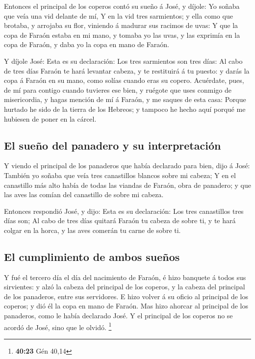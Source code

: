  Entonces el principal de los coperos contó su sueño á
José, y díjole: Yo soñaba que veía una vid delante de mí,
 Y en la vid tres sarmientos; y ella como que brotaba, y
arrojaba su flor, viniendo á madurar sus racimos de uvas:
 Y que la copa de Faraón estaba en mi mano, y tomaba yo
las uvas, y las exprimía en la copa de Faraón, y daba yo la copa en mano
de Faraón.

 Y díjole José: Esta es su declaración: Los tres
sarmientos son tres días:  Al cabo de tres días Faraón te
hará levantar cabeza, y te restituirá á tu puesto: y darás la copa á
Faraón en su mano, como solías cuando eras su copero. 
Acuérdate, pues, de mí para contigo cuando tuvieres ese bien, y ruégote
que uses conmigo de misericordia, y hagas mención de mí á Faraón, y me
saques de esta casa:  Porque hurtado he sido de la tierra
de los Hebreos; y tampoco he hecho aquí porqué me hubiesen de poner en
la cárcel.

\hypertarget{el-sueuxf1o-del-panadero-y-su-interpretaciuxf3n}{%
\subsection{El sueño del panadero y su
interpretación}\label{el-sueuxf1o-del-panadero-y-su-interpretaciuxf3n}}

 Y viendo el principal de los panaderos que había
declarado para bien, dijo á José: También yo soñaba que veía tres
canastillos blancos sobre mi cabeza;  Y en el canastillo
más alto había de todas las viandas de Faraón, obra de panadero; y que
las aves las comían del canastillo de sobre mi cabeza.

 Entonces respondió José, y dijo: Esta es su declaración:
Los tres canastillos tres días son;  Al cabo de tres días
quitará Faraón tu cabeza de sobre ti, y te hará colgar en la horca, y
las aves comerán tu carne de sobre ti.

\hypertarget{el-cumplimiento-de-ambos-sueuxf1os}{%
\subsection{El cumplimiento de ambos
sueños}\label{el-cumplimiento-de-ambos-sueuxf1os}}

 Y fué el tercero día el día del nacimiento de Faraón, é
hizo banquete á todos sus sirvientes: y alzó la cabeza del principal de
los coperos, y la cabeza del principal de los panaderos, entre sus
servidores.  E hizo volver á su oficio al principal de
los coperos; y dió él la copa en mano de Faraón.  Mas
hizo ahorcar al principal de los panaderos, como le había declarado
José.  Y el principal de los coperos no se acordó de
José, sino que le olvidó. \footnote{\textbf{40:23} Gén 40,14}

